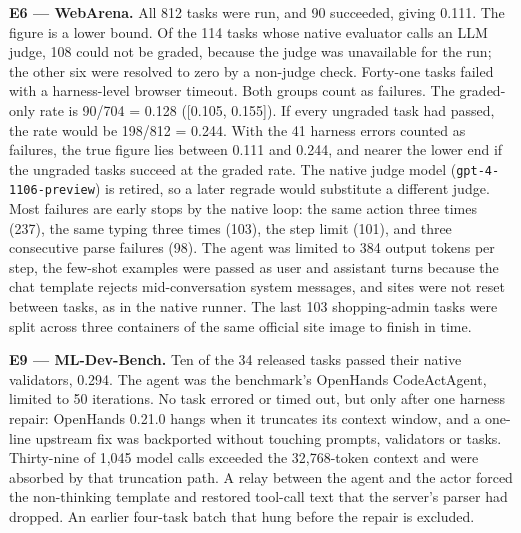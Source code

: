 \documentclass[12pt,a4paper]{report}
\begin{document}
\textbf{E6 --- WebArena.} All 812 tasks were run, and 90 succeeded,
giving 0.111. The figure is a lower bound. Of the 114 tasks whose native
evaluator calls an LLM judge, 108 could not be graded, because the judge
was unavailable for the run; the other six were resolved to zero by a
non-judge check. Forty-one tasks failed with a harness-level browser
timeout. Both groups count as failures. The graded-only rate is 90/704 =
0.128 ({[}0.105, 0.155{]}). If every ungraded task had passed, the rate
would be 198/812 = 0.244. With the 41 harness errors counted as
failures, the true figure lies between 0.111 and 0.244, and nearer the
lower end if the ungraded tasks succeed at the graded rate. The native
judge model (\texttt{gpt-4-1106-preview}) is retired, so a later regrade
would substitute a different judge. Most failures are early stops by the
native loop: the same action three times (237), the same typing three
times (103), the step limit (101), and three consecutive parse failures
(98). The agent was limited to 384 output tokens per step, the few-shot
examples were passed as user and assistant turns because the chat
template rejects mid-conversation system messages, and sites were not
reset between tasks, as in the native runner. The last 103
shopping-admin tasks were split across three containers of the same
official site image to finish in time.

\textbf{E9 --- ML-Dev-Bench.} Ten of the 34 released tasks passed their
native validators, 0.294. The agent was the benchmark's OpenHands
CodeActAgent, limited to 50 iterations. No task errored or timed out,
but only after one harness repair: OpenHands 0.21.0 hangs when it
truncates its context window, and a one-line upstream fix was backported
without touching prompts, validators or tasks. Thirty-nine of 1,045
model calls exceeded the 32,768-token context and were absorbed by that
truncation path. A relay between the agent and the actor forced the
non-thinking template and restored tool-call text that the server's
parser had dropped. An earlier four-task batch that hung before the
repair is excluded.
\end{document}
